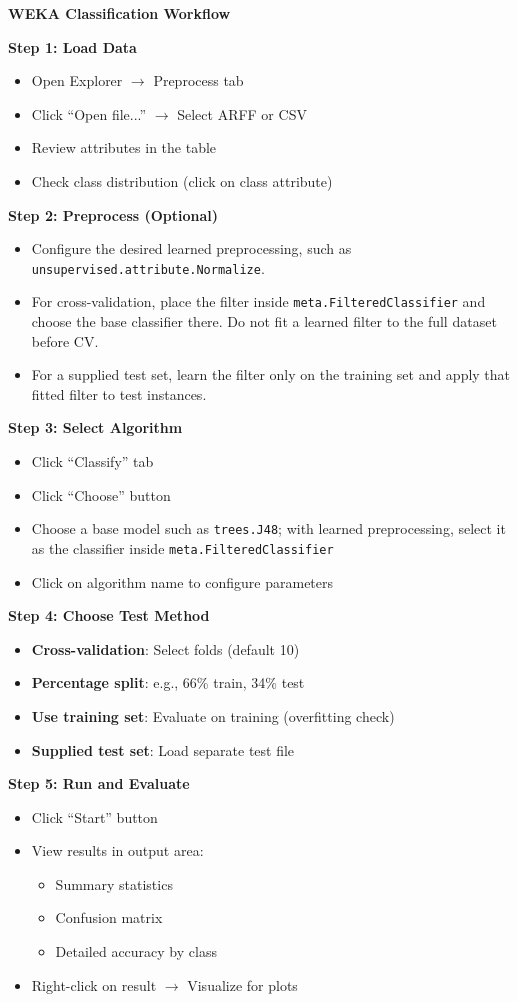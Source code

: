 \documentclass[11pt,twoside]{article}
\numberwithin{equation}{section}
\theoremstyle{plain}
\theoremstyle{definition}
\theoremstyle{remark}
\begin{document}
\begin{algorithmbox}
\textbf{WEKA Classification Workflow}

\textbf{Step 1: Load Data}
\begin{itemize}
\item Open Explorer $\to$ Preprocess tab
\item Click ``Open file...'' $\to$ Select ARFF or CSV
\item Review attributes in the table
\item Check class distribution (click on class attribute)
\end{itemize}

\textbf{Step 2: Preprocess (Optional)}
\begin{itemize}
\item Configure the desired learned preprocessing, such as \texttt{unsupervised.attribute.Normalize}.
\item For cross-validation, place the filter inside \texttt{meta.FilteredClassifier} and choose the base classifier there. Do not fit a learned filter to the full dataset before CV.
\item For a supplied test set, learn the filter only on the training set and apply that fitted filter to test instances.
\end{itemize}

\textbf{Step 3: Select Algorithm}
\begin{itemize}
\item Click ``Classify'' tab
\item Click ``Choose'' button
\item Choose a base model such as \texttt{trees.J48}; with learned preprocessing, select it as the classifier inside \texttt{meta.FilteredClassifier}
\item Click on algorithm name to configure parameters
\end{itemize}

\textbf{Step 4: Choose Test Method}
\begin{itemize}
\item \textbf{Cross-validation}: Select folds (default 10)
\item \textbf{Percentage split}: e.g., 66\% train, 34\% test
\item \textbf{Use training set}: Evaluate on training (overfitting check)
\item \textbf{Supplied test set}: Load separate test file
\end{itemize}

\textbf{Step 5: Run and Evaluate}
\begin{itemize}
\item Click ``Start'' button
\item View results in output area:
\begin{itemize}
\item Summary statistics
\item Confusion matrix
\item Detailed accuracy by class
\end{itemize}
\item Right-click on result $\to$ Visualize for plots
\end{itemize}


\end{algorithmbox}
\end{document}
